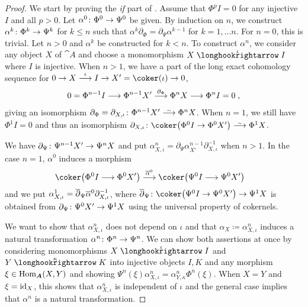 \documentclass[a4paper,parskip=half,numbers=enddot, DIV=12]{scrreprt}
\renewcommand{\leq}{\leqslant}
\begin{document}
\begin{proof}
	We start by proving the \emph{if} part of . Assume that $\Phi^pI=0$ for any injective $I$ and all $p>0$. Let $\alpha^0\colon\Phi^0\morphism\Psi^0$ be given. By induction on $n$, we construct $\alpha^k\colon\Phi^k\morphism\Psi^k$ for $k\leq n$ such that $\alpha^k\partial_\Phi=\partial_\Psi\alpha^{k-1}$ for $k=1,\ldots n$. For $ n=0$, this is trivial. Let $ n>0$ and $\alpha^k$ be constructed for $k< n$. To construct $\alpha^ n$, we consider any object $X$ of ${\cat A}$ and choose a monomorphism $X\monomorphism[\iota]I$ where $I$ is injective. When $ n>1$, we have a part of the long exact cohomology sequence for $0\morphism X\morphism[\iota]I\morphism X'=\coker(\iota)\morphism 0$,
	\begin{align*}
		0=\Phi^{ n-1}I\morphism\Phi^{ n-1}X'\morphism[\partial_\Phi]\Phi^ n X\morphism\Phi^ n I=0\;,
	\end{align*}
	giving an isomorphism $\partial_\Phi=\partial_{X,\iota}\colon\Phi^{ n-1}X'\isomorphism\Phi^ n X$. When $ n=1$, we still have $\Phi^1I=0$ and thus an isomorphism $\partial_{X,\iota}\colon\coker\big(\Phi^0I\morphism\Phi^0X'\big)\isomorphism\Phi^1X$. 
	
	We have $\partial_\Psi\colon\Psi^{ n-1}X'\morphism\Psi^ n X$ and put $\alpha_{X,\iota}^ n=\partial_\Psi\alpha_{X'}^{n-1}\partial_{X,\iota}^{-1}$ when $ n>1$. In the case $ n=1$, $\alpha^0$ induces a morphism
	\begin{align*}
		\coker\big(\Phi^0I\morphism\Phi^0X'\big)&\morphism[\ov{\alpha}^0]\coker\big(\Psi^0I\morphism\Psi^0X'\big)
	\end{align*}
	and we put $\alpha_{X,\iota}^1=\overline{\partial}_\Psi\overline{\alpha}^0\partial_{X,\iota}^{-1}$, where $\ov{\partial}_\Psi\colon \coker\big(\Psi^0I\morphism\Psi^0X'\big)\morphism\Psi^1X$ is obtained from $\partial_\Psi\colon\Psi^0X'\morphism\Psi^1X$ using the universal property of cokernels.
	
	We want to show that $\alpha_{X,\iota}^ n$ does not depend on $\iota$ and that $\alpha_X\coloneqq \alpha_{X,\iota}^n$ induces a natural transformation $\alpha^n\colon\Phi^n\morphism\Psi^n$. We can show both assertions at once by considering monomorphisms $X\monomorphism[\iota]I$ and $Y\monomorphism[\kappa]K$ into injective objects $I,K$ and any morphism $\xi\in\Hom_{\cat A}(X,Y)$ and showing $\Psi^n(\xi)\alpha_{X,\iota}^n=\alpha_{Y,\kappa}^n\Phi^n(\xi)$. When $X=Y$ and $\xi=\operatorname{id}_X$, this shows that $\alpha_{X,\iota}^n$ is independent of $\iota$ and the general case implies that $\alpha^n$ is a natural transformation. 
	

\end{proof}
\end{document}
